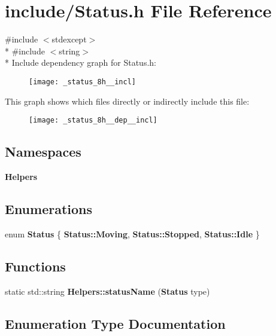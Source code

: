 \section{include/\+Status.h File Reference}
\label{_status_8h}
{\ttfamily \#include $<$stdexcept$>$}\\*
{\ttfamily \#include $<$string$>$}\\*
Include dependency graph for Status.\+h\+:\nopagebreak
\begin{figure}[H]
\begin{center}
\leavevmode
\texttt{[image: \_status\_8h\_\_incl]}
\end{center}
\end{figure}
This graph shows which files directly or indirectly include this file\+:\nopagebreak
\begin{figure}[H]
\begin{center}
\leavevmode
\texttt{[image: \_status\_8h\_\_dep\_\_incl]}
\end{center}
\end{figure}
\subsection*{Namespaces}
\begin{DoxyCompactItemize}
\item 
 {\bf Helpers}
\end{DoxyCompactItemize}
\subsection*{Enumerations}
\begin{DoxyCompactItemize}
\item 
enum {\bf Status} \{ {\bf Status\+::\+Moving}, 
{\bf Status\+::\+Stopped}, 
{\bf Status\+::\+Idle}
 \}
\end{DoxyCompactItemize}
\subsection*{Functions}
\begin{DoxyCompactItemize}
\item 
static std\+::string {\bf Helpers\+::status\+Name} ({\bf Status} type)
\end{DoxyCompactItemize}


\subsection{Enumeration Type Documentation}

